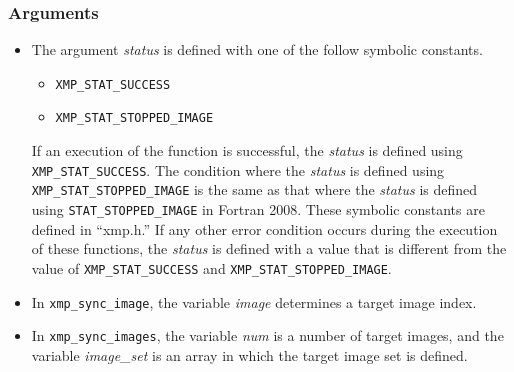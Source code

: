 \subsubsection*{Arguments}
\begin{itemize}
  \item The argument {\it status} is defined with one of the follow symbolic constants.
  \begin{itemize}
    \item {\tt XMP\_STAT\_SUCCESS}
    \item {\tt XMP\_STAT\_STOPPED\_IMAGE}
  \end{itemize}
  If an execution of the function is successful, the {\it status} is defined using {\tt XMP\_STAT\_SUCCESS}.
  The condition where the {\it status} is defined using {\tt XMP\_STAT\_STOPPED\_IMAGE} is the same as 
  that where the {\it status} is defined using {\tt STAT\_STOPPED\_IMAGE} in Fortran 2008.
  These symbolic constants are defined in ``xmp.h.''
  If any other error condition occurs during the execution of these functions,
  the {\it status} is defined with a value that is different from the value of {\tt XMP\_STAT\_SUCCESS} and
  {\tt XMP\_STAT\_STOPPED\_IMAGE}.
  \item In {\tt xmp\_sync\_image}, the variable {\it image} determines a target image index.
  \item In {\tt xmp\_sync\_images}, the variable {\it num} is a number of target images, and 
        the variable {\it image\_set} is an array in which the target image set is defined.
\end{itemize}

